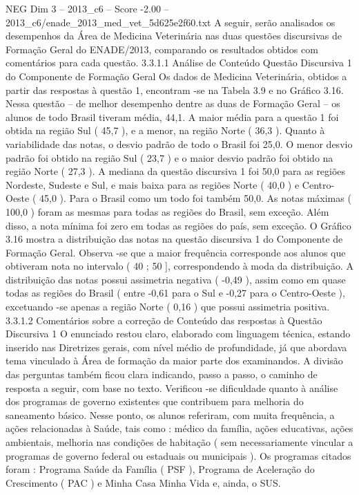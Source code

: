\begin{textsample}{NEG Dim 3 – 2013\_c6 – Score -2.00 – 2013\_c6/enade\_2013\_med\_vet\_5d625e2f60.txt}
A seguir, serão analisados os desempenhos da Área de Medicina Veterinária nas duas questões discursivas de Formação Geral do ENADE/2013, comparando os resultados obtidos com comentários para cada questão. 3.3.1.1 Análise de Conteúdo Questão Discursiva 1 do Componente de Formação Geral Os dados de Medicina Veterinária, obtidos a partir das respostas à questão 1, encontram -se na Tabela 3.9 e no Gráfico 3.16.
Nessa questão – de melhor desempenho dentre as duas de Formação Geral – os alunos de todo Brasil tiveram média, 44,1.
A maior média para a questão 1 foi obtida na região Sul ( 45,7 ), e a menor, na região Norte ( 36,3 ).
Quanto à variabilidade das notas, o desvio padrão de todo o Brasil foi 25,0.
O menor desvio padrão foi obtido na região Sul ( 23,7 ) e o maior desvio padrão foi obtido na região Norte ( 27,3 ).
A mediana da questão discursiva 1 foi 50,0 para as regiões Nordeste, Sudeste e Sul, e mais baixa para as regiões Norte ( 40,0 ) e Centro-Oeste ( 45,0 ).
Para o Brasil como um todo foi também 50,0.
As notas máximas ( 100,0 ) foram as mesmas para todas as regiões do Brasil, sem exceção.
Além disso, a nota mínima foi zero em todas as regiões do país, sem exceção.
O Gráfico 3.16 mostra a distribuição das notas na questão discursiva 1 do Componente de Formação Geral.
Observa -se que a maior frequência corresponde aos alunos que obtiveram nota no intervalo ( 40 ; 50 ], correspondendo à moda da distribuição.
A distribuição das notas possui assimetria negativa ( -0,49 ), assim como em quase todas as regiões do Brasil ( entre -0,61 para o Sul e -0,27 para o Centro-Oeste ), excetuando -se apenas a região Norte ( 0,16 ) que possui assimetria positiva. 3.3.1.2 Comentários sobre a correção de Conteúdo das respostas à Questão Discursiva 1 O enunciado restou claro, elaborado com linguagem técnica, estando inserido nas Diretrizes gerais, com nível médio de profundidade, já que abordava tema vinculado à Área de formação da maior parte dos examinandos.
A divisão das perguntas também ficou clara indicando, passo a passo, o caminho de resposta a seguir, com base no texto.
Verificou -se dificuldade quanto à análise dos programas de governo existentes que contribuem para melhoria do saneamento básico.
Nesse ponto, os alunos referiram, com muita frequência, a ações relacionadas à Saúde, tais como : médico da família, ações educativas, ações ambientais, melhoria nas condições de habitação ( sem necessariamente vincular a programas de governo federal ou estaduais ou municipais ).
Os programas citados foram : Programa Saúde da Família ( PSF ), Programa de Aceleração do Crescimento ( PAC ) e Minha Casa Minha Vida e, ainda, o SUS.

\end{textsample}
